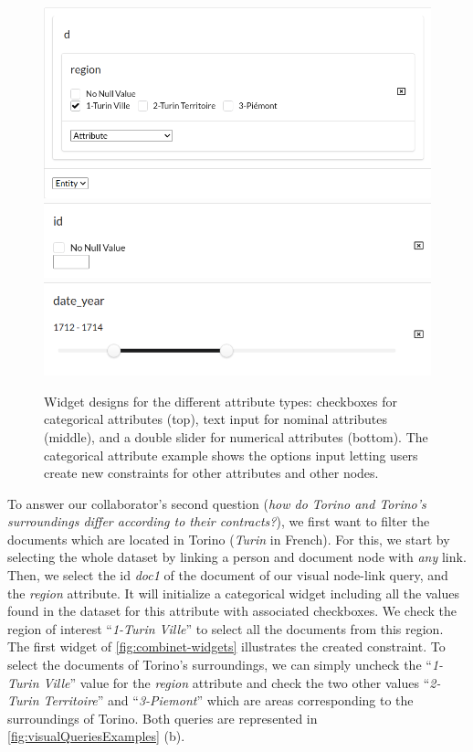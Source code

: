 \begin{figure}[b]
    \centering
    \includegraphics[width=0.7\linewidth]{static/figures/ComBiNet/OriginalPaperFigures/constraintRegion.png}\\
    \includegraphics[width=0.6\linewidth]{static/figures/ComBiNet/OriginalPaperFigures/nominalWidget}\\
    \includegraphics[width=0.6\linewidth]{static/figures/ComBiNet/OriginalPaperFigures/numericWidget}

    \caption{Widget designs for the different attribute types: checkboxes for categorical attributes (top), text input for nominal attributes (middle), and a double slider for numerical attributes (bottom). The categorical attribute example shows the options input letting users create new constraints for other attributes and other nodes.}\label{fig:combinet-widgets}
\end{figure}

To answer our collaborator's second question (\textit{how do Torino and Torino's surroundings differ according to their contracts?}), we first want to filter the documents which are located in Torino (\textit{Turin} in French).
For this, we start by selecting the whole dataset by linking a person and document node with \textit{any} link.
Then, we select the id \textit{doc1} of the document of our visual node-link query, and the \textit{region} attribute.
It will initialize a categorical widget including all the values found in the dataset for this attribute with associated checkboxes.
We check the region of interest ``\textit{1-Turin Ville}'' to select all the documents from this region.
 The first widget of \autoref{fig:combinet-widgets} illustrates the created constraint.
To select the documents of Torino's surroundings, we can simply uncheck the ``\textit{1-Turin Ville}'' value for the \textit{region} attribute and check the two other values ``\textit{2-Turin Territoire}'' and ``\textit{3-Piemont}'' which are areas corresponding to the surroundings of Torino.
Both queries are represented in \autoref{fig:visualQueriesExamples} (b).


